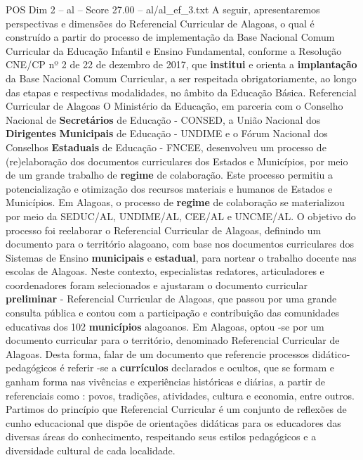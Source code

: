 \begin{textsample}{POS Dim 2 – al – Score 27.00 – al/al\_ef\_3.txt}  \label{ex:f2_pos_263}
A seguir, apresentaremos perspectivas e dimensões do Referencial Curricular de Alagoas, o qual é construído a partir do processo de implementação da Base Nacional Comum Curricular da Educação Infantil e Ensino Fundamental, conforme a Resolução CNE/CP nº 2 de 22 de dezembro de 2017, que \textbf{institui} e orienta a \textbf{implantação} da Base Nacional Comum Curricular, a ser respeitada obrigatoriamente, ao longo das etapas e respectivas modalidades, no âmbito da Educação Básica.
Referencial Curricular de Alagoas O Ministério da Educação, em parceria com o Conselho Nacional de \textbf{Secretários} de Educação - CONSED, a União Nacional dos \textbf{Dirigentes} \textbf{Municipais} de Educação - UNDIME e o Fórum Nacional dos Conselhos \textbf{Estaduais} de Educação - FNCEE, desenvolveu um processo de (re)elaboração dos documentos curriculares dos Estados e Municípios, por meio de um grande trabalho de \textbf{regime} de colaboração.
Este processo permitiu a potencialização e otimização dos recursos materiais e humanos de Estados e Municípios.
Em Alagoas, o processo de \textbf{regime} de colaboração se materializou por meio da SEDUC/AL, UNDIME/AL, CEE/AL e UNCME/AL.
O objetivo do processo foi reelaborar o Referencial Curricular de Alagoas, definindo um documento para o território alagoano, com base nos documentos curriculares dos Sistemas de Ensino \textbf{municipais} e \textbf{estadual}, para nortear o trabalho docente nas escolas de Alagoas.
Neste contexto, especialistas redatores, articuladores e coordenadores foram selecionados e ajustaram o documento curricular \textbf{preliminar} - Referencial Curricular de Alagoas, que passou por uma grande consulta pública e contou com a participação e contribuição das comunidades educativas dos 102 \textbf{municípios} alagoanos.
Em Alagoas, optou -se por um documento curricular para o território, denominado Referencial Curricular de Alagoas.
Desta forma, falar de um documento que referencie processos didático-pedagógicos é referir -se a \textbf{currículos} declarados e ocultos, que se formam e ganham forma nas vivências e experiências históricas e diárias, a partir de referenciais como : povos, tradições, atividades, cultura e economia, entre outros.
Partimos do princípio que Referencial Curricular é um conjunto de reflexões de cunho educacional que dispõe de orientações didáticas para os educadores das diversas áreas do conhecimento, respeitando seus estilos pedagógicos e a diversidade cultural de cada localidade.

\end{textsample}
